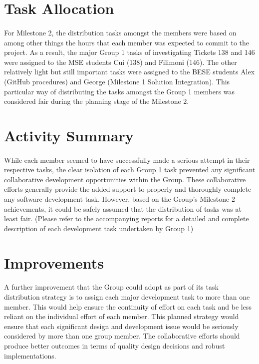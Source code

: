 \documentclass[oneside, 10pt, a4]{article}
\begin{document}
\section{Task Allocation}

\paragraph{}
For Milestone 2, the distribution tasks amongst the members were based on among other 
things the hours that each member was expected to commit to the project. As a result, the
 major Group 1 tasks of investigating Tickets 138 and 146  were assigned to the MSE students Cui 
 (138) and Filimoni (146). The other relatively light but still important tasks were assigned 
 to the BESE students Alex (GitHub procedures) and George (Milestone 1 Solution Integration). 
 This particular way of distributing the tasks amongst the Group 1 members was considered fair 
 during the planning stage of the Milestone 2.

\section{Activity Summary}

\paragraph{}
While each member seemed to have successfully made a serious attempt in their respective 
tasks, the clear isolation of each Group 1 task prevented any significant collaborative
development opportunities within the Group. These collaborative efforts generally provide 
the added support to properly and thoroughly complete any software development task. However, 
based on the Group's Milestone 2 achievements, it could be safely assumed that the distribution 
of tasks was at least fair. (Please refer to the accompanying reports for a detailed and complete 
description of each development task undertaken by Group 1)

\section{Improvements}

\paragraph{}
A further improvement that the Group could adopt as part of its task distribution 
strategy is to assign each major development task to more than one member. This would 
help ensure the continuity of effort on each task and be less reliant on the individual 
effort of each member. This planned strategy would ensure that each significant design 
and development issue would be seriously considered by more than one group member. The 
collaborative efforts should produce better outcomes in terms of quality design decisions 
and robust implementations.
\end{document}
